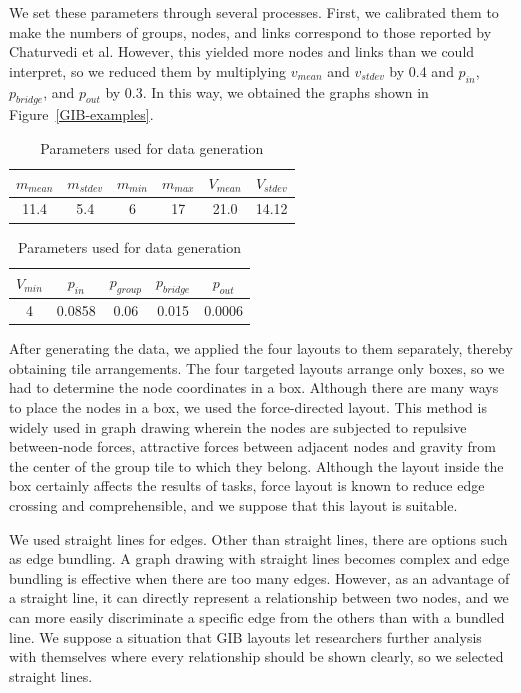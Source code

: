 \documentclass[review]{vgtc}                 %
\begin{document}
We set these parameters through several processes.
First, we calibrated them to make the numbers of groups, nodes, and links correspond to those reported by Chaturvedi et al.
However, this yielded more nodes and links than we could interpret, so we reduced them by multiplying $v_{mean}$ and $v_{stdev}$ by 0.4 and $p_{in}$, $p_{bridge}$, and $p_{out}$ by 0.3.
In this way, we obtained the graphs shown in Figure~\ref{GIB-examples}.

\begin{table}[h]
  \begin{center}
  \caption{Parameters used for data generation}
  \label{parameters}
    \begin{tabular}{|c|c|c|c|c|c|} \hline
      $m_{mean}$ & $m_{stdev}$ & $m_{min}$ & $m_{max}$ & $V_{mean}$ & $V_{stdev}$ \\ \hline 
      11.4 & 5.4 & 6 & 17 & 21.0 & 14.12 \\ \hline
    \end{tabular}
    \begin{tabular}{|c|c|c|c|c|} \hline
      $V_{min}$ & $p_{in}$ & $p_{group}$ & $p_{bridge}$ & $p_{out}$ \\ \hline
      4 & 0.0858 & 0.06 & 0.015 & 0.0006 \\ \hline
    \end{tabular}
  \end{center}
\end{table}

After generating the data, we applied the four layouts to them separately, thereby obtaining tile arrangements.
The four targeted layouts arrange only boxes, so we had to determine the node coordinates in a box.
Although there are many ways to place the nodes in a box, we used the force-directed layout.
This method is widely used in graph drawing wherein the nodes are subjected to repulsive between-node forces, attractive forces between adjacent nodes and gravity from the center of the group tile to which they belong.
Although the layout inside the box certainly affects the results of tasks, force layout is known to reduce edge crossing and comprehensible, and we suppose that this layout is suitable.

We used straight lines for edges.
Other than straight lines, there are options such as edge bundling.
A graph drawing with straight lines becomes complex and edge bundling is effective when there are too many edges.
However, as an advantage of a straight line, it can directly represent a relationship between two nodes, and we can more easily discriminate a specific edge from the others than with a bundled line.
We suppose a situation that GIB layouts let researchers further analysis with themselves where every relationship should be shown clearly, so we selected straight lines.
\end{document}
